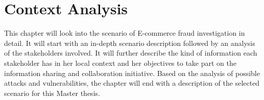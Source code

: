 
\chapter{Context Analysis} %
\label{cha:context_analysis}

This chapter will look into the scenario of E-commerce fraud investigation in detail.
It will start with an in-depth scenario description followed by an analysis of the stakeholders involved. It will further describe the kind of information each stakeholder has in her local context and her objectives to take part on the information sharing and collaboration initiative. Based on the analysis of possible attacks and vulnerabilities, the chapter will end with a description of the selected scenario for this Master thesis.










